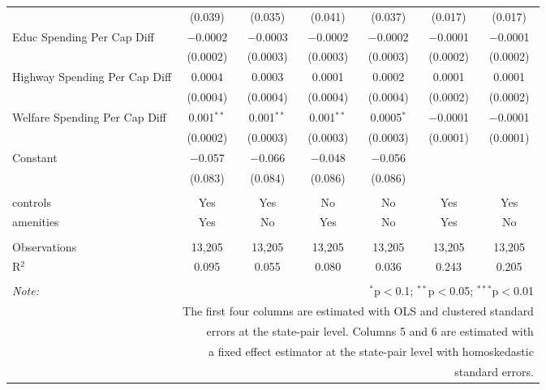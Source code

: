 \begin{table}[!htbp]
\begin{tabular}{@{\extracolsep{5pt}}lcccccc}
  & (0.039) & (0.035) & (0.041) & (0.037) & (0.017) & (0.017) \\ 
  Educ Spending Per Cap Diff & $-$0.0002 & $-$0.0003 & $-$0.0002 & $-$0.0002 & $-$0.0001 & $-$0.0001 \\ 
  & (0.0002) & (0.0003) & (0.0003) & (0.0003) & (0.0002) & (0.0002) \\ 
  Highway Spending Per Cap Diff & 0.0004 & 0.0003 & 0.0001 & 0.0002 & 0.0001 & 0.0001 \\ 
  & (0.0004) & (0.0004) & (0.0004) & (0.0004) & (0.0002) & (0.0002) \\ 
  Welfare Spending Per Cap Diff & 0.001$^{**}$ & 0.001$^{**}$ & 0.001$^{**}$ & 0.0005$^{*}$ & $-$0.0001 & $-$0.0001 \\ 
  & (0.0002) & (0.0003) & (0.0003) & (0.0003) & (0.0001) & (0.0001) \\ 
  Constant & $-$0.057 & $-$0.066 & $-$0.048 & $-$0.056 &  &  \\ 
  & (0.083) & (0.084) & (0.086) & (0.086) &  &  \\ 
 \hline \\[-1.8ex] 
controls & Yes & Yes & No & No & Yes & Yes \\ 
amenities & Yes & No & Yes & No & Yes & No \\ 
\hline \\[-1.8ex] 
Observations & 13,205 & 13,205 & 13,205 & 13,205 & 13,205 & 13,205 \\ 
R$^{2}$ & 0.095 & 0.055 & 0.080 & 0.036 & 0.243 & 0.205 \\ 
\hline 
\hline \\[-1.8ex] 
\textit{Note:}  & \multicolumn{6}{r}{$^{*}$p$<$0.1; $^{**}$p$<$0.05; $^{***}$p$<$0.01} \\ 
 & \multicolumn{6}{r}{The first four columns are estimated with OLS and clustered standard} \\ 
 & \multicolumn{6}{r}{ errors at the state-pair level. Columns 5 and 6 are estimated with} \\ 
 & \multicolumn{6}{r}{a fixed effect estimator at the state-pair level with homoskedastic} \\ 
 & \multicolumn{6}{r}{standard errors.} \\ 
\end{tabular} 
\end{table} 
